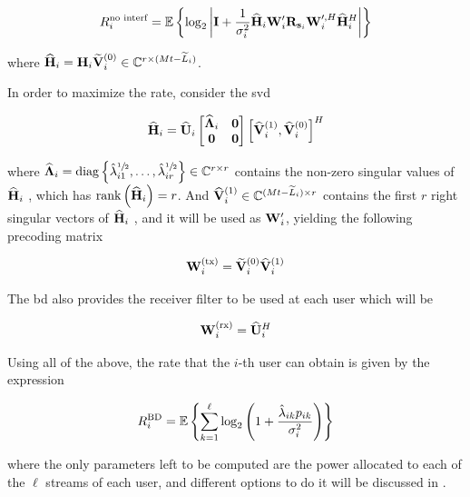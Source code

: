 \begin{equation} \label{eq:bd_ergodic_capacity_nosvd}
    R_i^{\text{no interf}} = \mathbb{E}\left\{
        \log_2\left| \mathbf{I} + \frac{1}{\sigma_i^2}\mathbf{\widehat{H}}_i\mathbf{W}_i^{\prime}
        \mathbf{R}_{\mathbf{s}_i} \mathbf{W}_i^{\prime,H}\mathbf{\widehat{H}}_i^H
    \right|
    \right\}
\end{equation}

\noindent
where $\mathbf{\widehat{H}}_i = \mathbf{H}_i\mathbf{\widetilde{V}}_i^{(0)} \in \mathbb{C}^{r \times (Mt - \widetilde{L}_i)}$.

In order to maximize the rate, consider the \gls{svd}

\begin{equation} \label{eq:svd_max_rate}
    \mathbf{\widehat{H}}_i = \mathbf{\widehat{U}}_i \begin{bmatrix}
        \mathbf{\widehat{\Lambda}}_i & \mathbf{0} \\
        \mathbf{0}        & \mathbf{0}
    \end{bmatrix} \left[ \mathbf{\widehat{V}}_i^{(1)}, \mathbf{\widehat{V}}_i^{(0)} \right]^H
\end{equation}

\noindent
where $\mathbf{\widehat{\Lambda}}_i = \operatorname*{diag}\left\{\hat{\lambda}^{\sfrac{1}{2}}_{i1}, \ldots,
\hat{\lambda}^{\sfrac{1}{2}}_{ir} \right\} \in \mathbb{C}^{r \times r}$ contains the non-zero singular
values of $\mathbf{\widehat{H}}_i$ , which has $\operatorname*{rank}\left(\mathbf{\widehat{H}}_i\right) = r$. And
$\mathbf{\widehat{V}}_i^{(1)} \in \mathbb{C}^{(Mt - \widetilde{L}_i) \times r}$ contains the first $r$ right
singular vectors of $\mathbf{\widehat{H}}_i$ , and it will be used as $\mathbf{W}_i^{\prime}$,
yielding the following precoding matrix

\begin{equation} \label{eq:bd_precod}
    \mathbf{W}^{(\text{tx})}_i = \mathbf{\widetilde{V}}_i^{(0)} \mathbf{\widehat{V}}_i^{(1)}
\end{equation}

The \gls{bd} also provides the receiver filter to be used at each user which
will be

\begin{equation} \label{eq:bd_eq}
    \mathbf{W}^{(\text{rx})}_i = \mathbf{\widehat{U}}_i^H
\end{equation}

Using all of the above, the rate that the $i$-th user can obtain is given by the
expression

\begin{equation} \label{eq:bd_ergodic_capacity}
    R_i^{\text{BD}} = \mathbb{E}\left\{
        \sum\limits_{k = 1}^{\ell} \log_2 \left(1 + \frac{\hat{\lambda}_{ik}
        p_{ik}}{\sigma_i^2} \right)
    \right\}
\end{equation}

\noindent
where the only parameters left to be computed are the power allocated to each of
the $\ell$ streams of each user, and different options to do it will be
discussed in .

